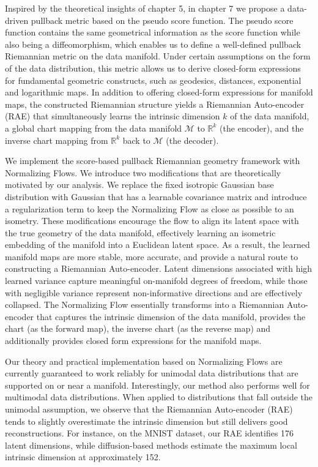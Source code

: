 Inspired by the theoretical insights of chapter 5, in chapter 7 we propose a data-driven pullback metric based on the pseudo score function. The pseudo score function contains the same geometrical information as the score function while also being a diffeomorphism, which enables us to define a well-defined pullback Riemannian metric on the data manifold. Under certain assumptions on the form of the data distribution, this metric allows us to derive closed-form expressions for fundamental geometric constructs, such as geodesics, distances, exponential and logarithmic maps. In addition to offering closed-form expressions for manifold maps, the constructed Riemannian structure yields a Riemannian Auto-encoder (RAE) that simultaneously learns the intrinsic dimension \( k \) of the data manifold, a global chart mapping from the data manifold \(\mathcal{M}\) to \(\mathbb{R}^k\) (the encoder), and the inverse chart mapping from \(\mathbb{R}^k\) back to \(\mathcal{M}\) (the decoder).

We implement the score-based pullback Riemannian geometry framework with Normalizing Flows. We introduce two modifications that are theoretically motivated by our analysis. We replace the fixed isotropic Gaussian base distribution with Gaussian that has a learnable covariance matrix and introduce a regularization term to keep the Normalizing Flow as close as possible to an isometry. These modifications encourage the flow to align its latent space with the true geometry of the data manifold, effectively learning an isometric embedding of the manifold into a Euclidean latent space. As a result, the learned manifold maps are more stable, more accurate, and provide a natural route to constructing a Riemannian Auto-encoder. Latent dimensions associated with high learned variance capture meaningful on-manifold degrees of freedom, while those with negligible variance represent non-informative directions and are effectively collapsed. The Normalizing Flow essentially transforms into a Riemannian Auto-encoder that captures the intrinsic dimension of the data manifold, provides the chart (as the forward map), the inverse chart (as the reverse map) and additionally provides closed form expressions for the manifold maps. 


Our theory and practical implementation based on Normalizing Flows are currently guaranteed to work reliably for unimodal data distributions that are supported on or near a manifold. Interestingly, our method also performs well for multimodal data distributions. When applied to distributions that fall outside the unimodal assumption, we observe that the Riemannian Auto-encoder (RAE) tends to slightly overestimate the intrinsic dimension but still delivers good reconstructions. For instance, on the MNIST dataset, our RAE identifies 176 latent dimensions, while diffusion-based methods estimate the maximum local intrinsic dimension at approximately 152.

